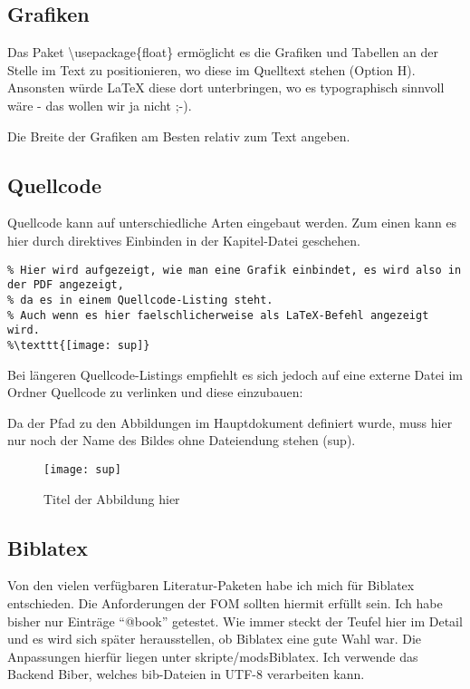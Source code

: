 \subsection{Grafiken}
Das Paket \textbackslash usepackage\{float\} ermöglicht es die Grafiken und Tabellen an der Stelle im Text zu
positionieren, wo diese im Quelltext stehen (Option H). Ansonsten würde \LaTeX{} diese dort unterbringen, wo es
typographisch sinnvoll wäre - das wollen wir ja nicht ;-).

Die Breite der Grafiken am Besten relativ zum Text angeben.

\subsection{Quellcode}
Quellcode kann auf unterschiedliche Arten eingebaut werden.
Zum einen kann es hier durch direktives Einbinden in der Kapitel-Datei geschehen.
\begin{lstlisting}
% Hier wird aufgezeigt, wie man eine Grafik einbindet, es wird also in der PDF angezeigt,
% da es in einem Quellcode-Listing steht.
% Auch wenn es hier faelschlicherweise als LaTeX-Befehl angezeigt wird.
%\texttt{[image: sup]}
\end{lstlisting}

Bei längeren Quellcode-Listings empfiehlt es sich jedoch auf eine externe Datei im Ordner Quellcode zu verlinken und diese einzubauen:


Da der Pfad zu den Abbildungen im Hauptdokument definiert wurde, muss hier nur noch der Name des Bildes ohne Dateiendung stehen (sup).

\begin{figure}[htbp]
	\begin{center}
		\raggedright\caption{Titel der Abbildung hier}
		\texttt{[image: sup]}
		\captionsetup{width=1.5\textwidth}
		\label{figur-k2}
	\end{center}
\end{figure}


\subsection{Biblatex}
Von den vielen verfügbaren Literatur-Paketen habe ich mich für Biblatex entschieden. Die Anforderungen der
FOM sollten hiermit erfüllt sein. Ich habe bisher nur Einträge
\enquote{@book} getestet. Wie immer steckt der Teufel hier im Detail und es wird sich später herausstellen, ob Biblatex
eine gute Wahl war. Die Anpassungen hierfür liegen unter skripte/modsBiblatex. Ich verwende das Backend Biber, welches
bib-Dateien in UTF-8 verarbeiten kann.

